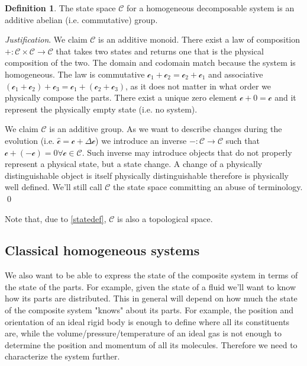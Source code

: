 \documentclass[aps,pra,10pt,twocolumn,floatfix,nofootinbib]{revtex4-1}
\theoremstyle{definition}
\newtheorem{defn}[prop]{Definition}
\newenvironment{justification}{\emph{Justification}.}{\qed}
\begin{document}
\begin{defn}\label{reducible_state_space}
The state space $\mathcal{C}$ for a homogeneous decomposable system is an additive abelian (i.e. commutative) group.
\end{defn}

\begin{justification}
We claim $\mathcal{C}$ is an additive monoid. There exist a law of composition $+ : \mathcal{C} \times \mathcal{C} \rightarrow \mathcal{C}$ that takes two states and returns one that is the physical composition of the two. The domain and codomain match because the system is homogeneous. The law is commutative $\mathcal{c}_1 +\mathcal{c}_2 = \mathcal{c}_2+\mathcal{c}_1$ and associative $(\mathcal{c}_1 + \mathcal{c}_2) + \mathcal{c}_3 = \mathcal{c}_1 + (\mathcal{c}_2 + \mathcal{c}_3)$, as it does not matter in what order we physically compose the parts. There exist a unique zero element $\mathcal{c} + 0 = \mathcal{c}$ and it represent the physically empty state (i.e. no system).

We claim $\mathcal{C}$ is an additive group. As we want to describe changes during the evolution (i.e. $\hat{\mathcal{c}} = \mathcal{c} +\Delta \mathcal{c}$) we introduce an inverse $- : \mathcal{C} \rightarrow \mathcal{C}$ such that $\mathcal{c} + ( - \mathcal{c}) = 0 \forall \mathcal{c} \in \mathcal{C}$. Such inverse may introduce objects that do not properly represent a physical state, but a state change. A change of a physically distinguishable object is itself physically distinguishable therefore is physically well defined. We'll still call $\mathcal{C}$ the state space committing an abuse of terminology.
\end{justification}

Note that, due to \ref{statedef}, $\mathcal{C}$ is also a topological space.

\subsection{Classical homogeneous systems}
We also want to be able to express the state of the composite system in terms of the state of the parts. For example, given the state of a fluid we'll want to know how its parts are distributed. This in general will depend on how much the state of the composite system "knows" about its parts. For example, the position and orientation of an ideal rigid body is enough to define where all its constituents are, while the volume/pressure/temperature of an ideal gas is not enough to determine the position and momentum of all its molecules. Therefore we need to characterize the system further.
\end{document}

